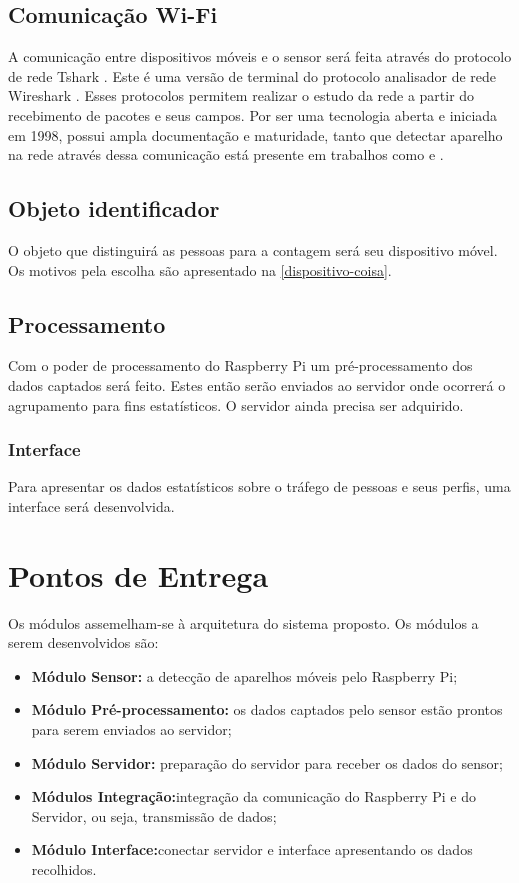 \subsection{Comunicação Wi-Fi}
A comunicação entre dispositivos móveis e o sensor será feita através do protocolo de rede Tshark \cite{Wireshark2017}. Este é uma versão de terminal do protocolo
analisador de rede Wireshark \cite{Wireshark2017a}. Esses protocolos permitem realizar o estudo da rede a partir do recebimento de pacotes e seus campos. Por
ser uma tecnologia aberta e iniciada em 1998, possui ampla documentação e maturidade, tanto que detectar aparelho na rede através dessa comunicação
está presente em trabalhos como  e .

\subsection{Objeto identificador}
O objeto que distinguirá as pessoas para a contagem será seu dispositivo móvel. Os motivos pela escolha são apresentado na \autoref{dispositivo-coisa}.

\subsection{Processamento}
Com o poder de processamento do Raspberry Pi um pré-processamento dos dados captados será feito. Estes então serão enviados ao servidor onde
ocorrerá o agrupamento para fins estatísticos. O servidor ainda precisa ser adquirido.

\subsubsection{Interface}
Para apresentar os dados estatísticos sobre o tráfego de pessoas e seus perfis, uma interface será desenvolvida.


\section{Pontos de Entrega}
\label{pontos-entrega}
Os módulos assemelham-se à arquitetura do sistema proposto. Os módulos a serem desenvolvidos são:
\begin{itemize}
  \item \textbf{Módulo Sensor:} a detecção de aparelhos móveis pelo Raspberry Pi;
  \item \textbf{Módulo Pré-processamento:} os dados captados pelo sensor estão prontos para serem enviados ao servidor;
  \item \textbf{Módulo Servidor:} preparação do servidor para receber os dados do sensor;
  \item \textbf{Módulos Integração:}integração da comunicação do Raspberry Pi e do Servidor, ou seja, transmissão de dados;
  \item \textbf{Módulo Interface:}conectar servidor e interface apresentando os dados recolhidos.
\end{itemize}

